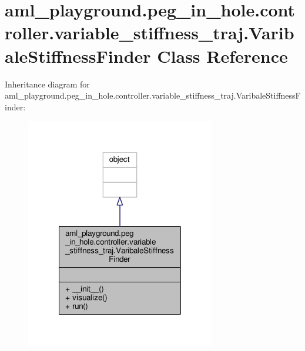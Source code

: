 \hypertarget{classaml__playground_1_1peg__in__hole_1_1controller_1_1variable__stiffness__traj_1_1_varibale_stiffness_finder}{\section{aml\-\_\-playground.\-peg\-\_\-in\-\_\-hole.\-controller.\-variable\-\_\-stiffness\-\_\-traj.\-Varibale\-Stiffness\-Finder Class Reference}
\label{classaml__playground_1_1peg__in__hole_1_1controller_1_1variable__stiffness__traj_1_1_varibale_stiffness_finder}
}


Inheritance diagram for aml\-\_\-playground.\-peg\-\_\-in\-\_\-hole.\-controller.\-variable\-\_\-stiffness\-\_\-traj.\-Varibale\-Stiffness\-Finder\-:
\nopagebreak
\begin{figure}[H]
\begin{center}
\leavevmode
\includegraphics[width=234pt]{classaml__playground_1_1peg__in__hole_1_1controller_1_1variable__stiffness__traj_1_1_varibale_stiffness_finder__inherit__graph}
\end{center}
\end{figure}


